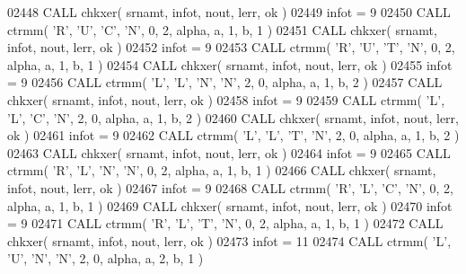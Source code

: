 \begin{DoxyCode}
02448       \textcolor{keyword}{CALL }chkxer( srnamt, infot, nout, lerr, ok )
02449       infot = 9
02450       \textcolor{keyword}{CALL }ctrmm( \textcolor{stringliteral}{'R'}, \textcolor{stringliteral}{'U'}, \textcolor{stringliteral}{'C'}, \textcolor{stringliteral}{'N'}, 0, 2, alpha, a, 1, b, 1 )
02451       \textcolor{keyword}{CALL }chkxer( srnamt, infot, nout, lerr, ok )
02452       infot = 9
02453       \textcolor{keyword}{CALL }ctrmm( \textcolor{stringliteral}{'R'}, \textcolor{stringliteral}{'U'}, \textcolor{stringliteral}{'T'}, \textcolor{stringliteral}{'N'}, 0, 2, alpha, a, 1, b, 1 )
02454       \textcolor{keyword}{CALL }chkxer( srnamt, infot, nout, lerr, ok )
02455       infot = 9
02456       \textcolor{keyword}{CALL }ctrmm( \textcolor{stringliteral}{'L'}, \textcolor{stringliteral}{'L'}, \textcolor{stringliteral}{'N'}, \textcolor{stringliteral}{'N'}, 2, 0, alpha, a, 1, b, 2 )
02457       \textcolor{keyword}{CALL }chkxer( srnamt, infot, nout, lerr, ok )
02458       infot = 9
02459       \textcolor{keyword}{CALL }ctrmm( \textcolor{stringliteral}{'L'}, \textcolor{stringliteral}{'L'}, \textcolor{stringliteral}{'C'}, \textcolor{stringliteral}{'N'}, 2, 0, alpha, a, 1, b, 2 )
02460       \textcolor{keyword}{CALL }chkxer( srnamt, infot, nout, lerr, ok )
02461       infot = 9
02462       \textcolor{keyword}{CALL }ctrmm( \textcolor{stringliteral}{'L'}, \textcolor{stringliteral}{'L'}, \textcolor{stringliteral}{'T'}, \textcolor{stringliteral}{'N'}, 2, 0, alpha, a, 1, b, 2 )
02463       \textcolor{keyword}{CALL }chkxer( srnamt, infot, nout, lerr, ok )
02464       infot = 9
02465       \textcolor{keyword}{CALL }ctrmm( \textcolor{stringliteral}{'R'}, \textcolor{stringliteral}{'L'}, \textcolor{stringliteral}{'N'}, \textcolor{stringliteral}{'N'}, 0, 2, alpha, a, 1, b, 1 )
02466       \textcolor{keyword}{CALL }chkxer( srnamt, infot, nout, lerr, ok )
02467       infot = 9
02468       \textcolor{keyword}{CALL }ctrmm( \textcolor{stringliteral}{'R'}, \textcolor{stringliteral}{'L'}, \textcolor{stringliteral}{'C'}, \textcolor{stringliteral}{'N'}, 0, 2, alpha, a, 1, b, 1 )
02469       \textcolor{keyword}{CALL }chkxer( srnamt, infot, nout, lerr, ok )
02470       infot = 9
02471       \textcolor{keyword}{CALL }ctrmm( \textcolor{stringliteral}{'R'}, \textcolor{stringliteral}{'L'}, \textcolor{stringliteral}{'T'}, \textcolor{stringliteral}{'N'}, 0, 2, alpha, a, 1, b, 1 )
02472       \textcolor{keyword}{CALL }chkxer( srnamt, infot, nout, lerr, ok )
02473       infot = 11
02474       \textcolor{keyword}{CALL }ctrmm( \textcolor{stringliteral}{'L'}, \textcolor{stringliteral}{'U'}, \textcolor{stringliteral}{'N'}, \textcolor{stringliteral}{'N'}, 2, 0, alpha, a, 2, b, 1 )

\end{DoxyCode}

